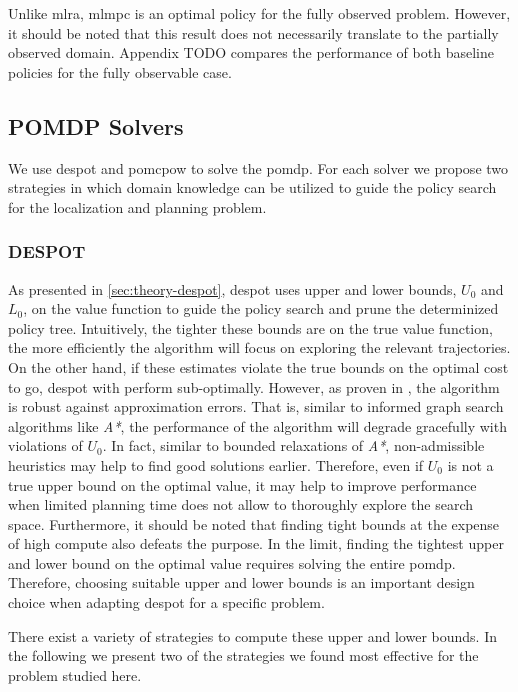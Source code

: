 Unlike \ac{mlra}, \ac{mlmpc} is an optimal policy for the fully observed
problem. However, it should be noted that this result does not necessarily
translate to the partially observed domain. Appendix TODO compares the performance of both baseline policies for the fully
observable case.

\subsection{POMDP Solvers}\label{sec:lp-planners}

We use \ac{despot} and \ac{pomcpow} to solve the \ac{pomdp}. For each solver we
propose two strategies in which domain knowledge can be utilized to guide the
policy search for the localization and planning problem.

\subsubsection{DESPOT}\label{sec:lp-planners-despot}

As presented in \cref{sec:theory-despot}, \ac{despot} uses upper and lower
bounds, $U_0$ and $L_0$, on the value function to guide the policy search and
prune the determinized policy tree. Intuitively, the tighter these bounds are on
the true value function, the more efficiently the algorithm will focus on
exploring the relevant trajectories. On the other hand, if these estimates
violate the true bounds on the optimal cost to go, \ac{despot} with perform
sub-optimally. However, as proven in \cite{somani2013despot}, the algorithm is
robust against approximation errors. That is, similar to informed graph search
algorithms like \emph{A*}, the performance of the algorithm will degrade
gracefully with violations of $U_0$. In fact, similar to bounded relaxations of
\emph{A*}, non-admissible heuristics may help to find good solutions earlier.
Therefore, even if $U_0$ is not a true upper bound on the optimal value, it may
help to improve performance when limited planning time does not allow to
thoroughly explore the search space. Furthermore, it should be noted that
finding tight bounds at the expense of high compute also defeats the purpose.
In the limit, finding the tightest upper and lower bound on the optimal value
requires solving the entire \ac{pomdp}. Therefore, choosing suitable upper and
lower bounds is an important design choice when adapting \ac{despot} for
a specific problem.

There exist a variety of strategies to compute these upper and lower bounds.
In the following we present two of the strategies we found most effective for
the problem studied here.

